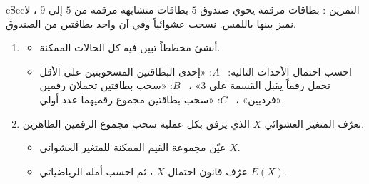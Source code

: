 \documentclass[12pt,a4paper]{article}
\newenvironment{BOX}[2]{\begin{otherlanguage}{english}\begin{arbox}{#1}{#2}}{\end{arbox}\end{otherlanguage}}
\newcounter{exo}
\newenvironment{tamrin}[1]{\stepcounter{exo}\begin{BOX}{cSec}{التمرين \theexo: #1}}{\end{BOX}}
\newenvironment{sq}{\begin{itemize}[leftmargin=2.4em,itemsep=3pt]}{\end{itemize}}
\newcommand{\qa}{\item[(أ)]}\newcommand{\qb}{\item[(ب)]}\newcommand{\qc}{\item[(جـ)]}\newcommand{\qd}{\item[(د)]}\newcommand{\qe}{\item[(هـ)]}
\begin{document}
\begin{tamrin}{بطاقات مرقمة}
يحوي صندوق $5$ بطاقات متشابهة مرقمة من $5$ إلى $9$ ، لا نميز بينها باللمس. نسحب عشوائياً وفي آن واحد بطاقتين من الصندوق.
\begin{enumerate}
\item
\begin{sq}
\qa أنشئ مخططاً تبين فيه كل الحالات الممكنة.
\qb احسب احتمال الأحداث التالية: \ $A$: «إحدى البطاقتين المسحوبتين على الأقل تحمل رقماً يقبل القسمة على $3$» ، \ $B$: «سحب بطاقتين تحملان رقمين فرديين» ، \ $C$: «سحب بطاقتين مجموع رقميهما عدد أولي».
\end{sq}
\item نعرّف المتغير العشوائي $X$ الذي يرفق بكل عملية سحب مجموع الرقمين الظاهرين.
\begin{sq}
\qa عيّن مجموعة القيم الممكنة للمتغير العشوائي $X$.
\qb عرّف قانون احتمال $X$ ، ثم احسب أمله الرياضياتي $E(X)$.
\end{sq}
\end{enumerate}
\end{tamrin}
\end{document}
